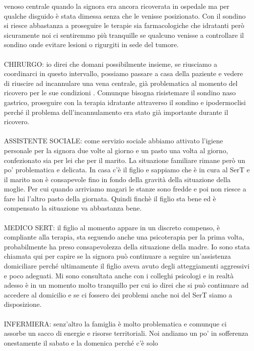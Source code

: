 venoso centrale quando la signora era ancora ricoverata in ospedale ma
per qualche disguido è stata dimessa senza che le venisse posizionato.
Con il sondino si riesce abbastanza a proseguire le terapie sia
farmacologiche che idratanti però sicuramente noi ci sentiremmo più
tranquille se qualcuno venisse a controllare il sondino onde evitare
lesioni o rigurgiti in sede del tumore.
\\\\
CHIRURGO: io direi che domani possibilmente insieme, se riusciamo a
coordinarci in questo intervallo, possiamo passare a casa della paziente
e vedere di riuscire ad incannulare una vena centrale, già problematica
al momento del ricovero per le sue condizioni . Comunque bisogna
risistemare il sondino naso gastrico, proseguire con la terapia
idratante attraverso il sondino e ipodermoclisi perché il problema
dell'incannulamento era stato già importante durante il ricovero.
\\\\
ASSISTENTE SOCIALE: come servizio sociale abbiamo attivato l'igiene
personale per la signora due volte al giorno e un pasto una volta al
giorno, confezionato sia per lei che per il marito. La situazione
familiare rimane però un po' problematica e delicata. In casa c'è il
figlio e sappiamo che è in cura al SerT e il marito non è consapevole
fino in fondo della gravità della situazione della moglie. Per cui
quando arriviamo magari le stanze sono fredde e poi non riesce a fare
lui l'altro pasto della giornata. Quindi finchè il figlio sta bene ed è
compensato la situazione va abbastanza bene.
\\\\
MEDICO SERT: il figlio al momento appare in un discreto compenso, è
compliante alla terapia, sta seguendo anche una psicoterapia per la
prima volta, probabilmente ha preso consapevolezza della situazione
della madre. Io sono stata chiamata qui per capire se la signora può
continuare a seguire un'assistenza domiciliare perché ultimamente il
figlio aveva avuto degli atteggiamenti aggressivi e poco adeguati. Mi
sono consultata anche con i colleghi psicologi e in realtà adesso è in
un momento molto tranquillo per cui io direi che si può continuare ad
accedere al domicilio e se ci fossero dei problemi anche noi del SerT
siamo a disposizione.
\\\\
INFERMIERA: senz'altro la famiglia è molto problematica e comunque ci
assorbe un sacco di energie e risorse territoriali. Noi andiamo un po'
in sofferenza onestamente il sabato e la domenica perché c'è solo
